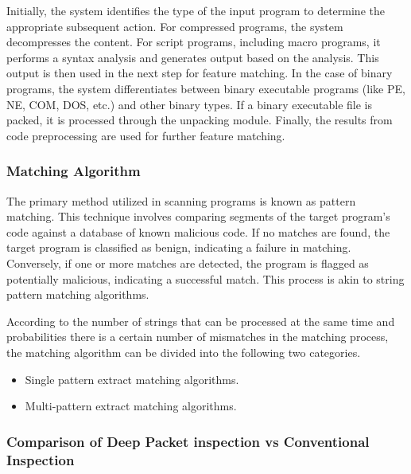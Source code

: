 \documentclass[12pt,letterpaper]{article}
\begin{document}
        Initially, the system identifies the type of the input program to determine the appropriate subsequent action. For compressed programs, the system decompresses the content. For script programs, including macro programs, it performs a syntax analysis and generates output based on the analysis. This output is then used in the next step for feature matching. In the case of binary programs, the system differentiates between binary executable programs (like PE, NE, COM, DOS, etc.) and other binary types. If a binary executable file is packed, it is processed through the unpacking module. Finally, the results from code preprocessing are used for further feature matching.

        \subsubsection{Matching Algorithm}

        The primary method utilized in scanning programs is known as pattern matching. This technique involves comparing segments of the target program's code against a database of known malicious code. If no matches are found, the target program is classified as benign, indicating a failure in matching. Conversely, if one or more matches are detected, the program is flagged as potentially malicious, indicating a successful match. This process is akin to string pattern matching algorithms.

        According to the number of strings that can be processed at the same time and probabilities there is a certain number of mismatches in the matching process, the matching algorithm can be divided into the following two categories.

        \begin{itemize}
            \item Single pattern extract matching algorithms.

            \item Multi-pattern extract matching algorithms.

        \end{itemize}


        \subsubsection{Comparison of Deep Packet inspection vs Conventional Inspection}
\end{document}
